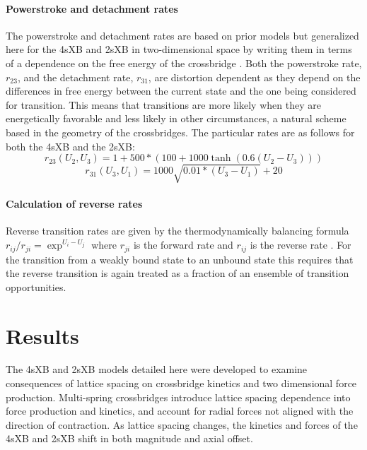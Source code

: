 \documentclass[]{article}
\begin{document}
\paragraph{Powerstroke and detachment rates} %
The powerstroke and detachment rates are based on prior models but  generalized here for the 4sXB and 2sXB in two-dimensional space by writing them in terms of a dependence on the free energy of the crossbridge  \citep{Pate1989, Tanner2007}. 
Both the powerstroke rate, $r_{23}$, and the detachment rate, $r_{31}$, are distortion dependent as they depend on the differences in free energy between the current state and the one being considered for transition. 
This means that transitions are more likely when they are energetically favorable and less likely in other circumstances, a natural scheme based in the geometry of the crossbridges.
The particular rates are as follows for both the 4sXB and the 2sXB: %
$$r_{23}(U_2, U_3) = 1 + 500 * (100 + 1000 \tanh(0.6 (U_2 - U_3))) $$
$$r_{31}(U_3, U_1) = 1000\sqrt{0.01 *  (U_3 - U_1)} + 20$$

\paragraph{Calculation of reverse rates} %
Reverse transition rates are given by the thermodynamically balancing formula $r_{ij}/r_{ji}=\exp^{U_i-U_j}$ where $r_{ji}$ is the forward rate and $r_{ij}$ is the reverse rate \citep{Pate1989, Daniel1998, Tanner2007}.
For the transition from a weakly bound state to an unbound state this requires that the reverse transition is again treated as a fraction of an ensemble of transition opportunities.



\section{Results} %

The 4sXB and 2sXB models detailed here were developed to examine consequences of lattice spacing on crossbridge kinetics and two dimensional force production.
Multi-spring crossbridges introduce lattice spacing dependence into force production and kinetics, and account for radial forces not aligned with the direction of contraction. 
As lattice spacing changes, the kinetics and forces of the 4sXB and 2sXB shift in both magnitude and axial offset.
\end{document}
